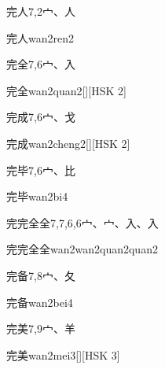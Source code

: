 \begin{Entry}{完人}{7,2}{⼧、⼈}
  \begin{Phonetics}{完人}{wan2ren2}
  \end{Phonetics}
\end{Entry}

\begin{Entry}{完全}{7,6}{⼧、⼊}
  \begin{Phonetics}{完全}{wan2quan2}[][HSK 2]
  \end{Phonetics}
\end{Entry}

\begin{Entry}{完成}{7,6}{⼧、⼽}
  \begin{Phonetics}{完成}{wan2cheng2}[][HSK 2]
  \end{Phonetics}
\end{Entry}

\begin{Entry}{完毕}{7,6}{⼧、⽐}
  \begin{Phonetics}{完毕}{wan2bi4}
  \end{Phonetics}
\end{Entry}

\begin{Entry}{完完全全}{7,7,6,6}{⼧、⼧、⼊、⼊}
  \begin{Phonetics}{完完全全}{wan2wan2quan2quan2}
  \end{Phonetics}
\end{Entry}

\begin{Entry}{完备}{7,8}{⼧、⼡}
  \begin{Phonetics}{完备}{wan2bei4}
  \end{Phonetics}
\end{Entry}

\begin{Entry}{完美}{7,9}{⼧、⽺}
  \begin{Phonetics}{完美}{wan2mei3}[][HSK 3]
  \end{Phonetics}
\end{Entry}

